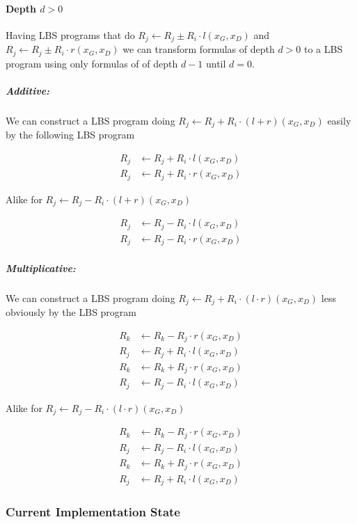 \documentclass[12pt, a4paper]{article}
\begin{document}
\paragraph{Depth $d > 0$}

Having LBS programs that do $R_j \leftarrow R_j \pm R_i \cdot l(x_G, x_D)$  and
$R_j \leftarrow R_j \pm R_i \cdot r(x_G, x_D)$ we can
transform formulas of depth $d > 0$ to a LBS program using only formulas of
of depth $d - 1$ until $d = 0$.

\subparagraph{Additive:} We can construct a LBS program doing $R_j \leftarrow
R_j + R_i \cdot (l + r)(x_G, x_D)$ easily by the following LBS program

\begin{align*}
R_j & \leftarrow R_j + R_i \cdot l(x_G, x_D) \\
R_j & \leftarrow R_j + R_i \cdot r(x_G, x_D)
\end{align*}

Alike for $R_j \leftarrow R_j - R_i \cdot (l + r)(x_G, x_D)$

\begin{align*}
R_j & \leftarrow R_j - R_i \cdot l(x_G, x_D) \\
R_j & \leftarrow R_j - R_i \cdot r(x_G, x_D)
\end{align*}


\subparagraph{Multiplicative:} We can construct a LBS program doing $R_j
\leftarrow R_j + R_i \cdot (l \cdot r)(x_G, x_D)$ less obviously by the LBS
program

\begin{align*}
R_k & \leftarrow R_k - R_j \cdot r(x_G, x_D) \\
R_j & \leftarrow R_j + R_i \cdot l(x_G, x_D) \\
R_k & \leftarrow R_k + R_j \cdot r(x_G, x_D) \\
R_j & \leftarrow R_j - R_i \cdot l(x_G, x_D)
\end{align*}

Alike for $R_j \leftarrow R_j - R_i \cdot (l \cdot r)(x_G, x_D)$

\begin{align*}
R_k & \leftarrow R_k - R_j \cdot r(x_G, x_D) \\
R_j & \leftarrow R_j - R_i \cdot l(x_G, x_D) \\
R_k & \leftarrow R_k + R_j \cdot r(x_G, x_D) \\
R_j & \leftarrow R_j + R_i \cdot l(x_G, x_D)
\end{align*}


\subsubsection{Current Implementation State}
\end{document}

